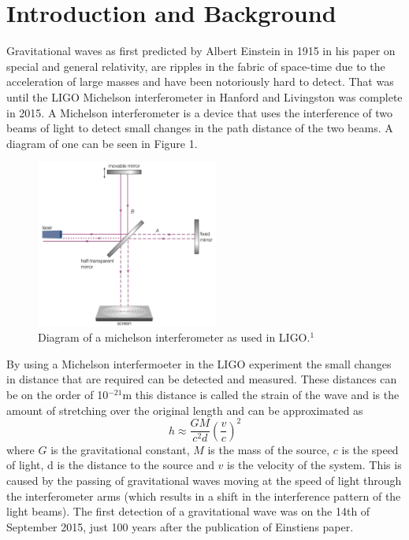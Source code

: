 \documentclass[]{article}
\begin{document}
\section*{Introduction and Background}
Gravitational waves as first predicted by Albert Einstein in 1915 in his paper on
special and general relativity, are ripples in the fabric of space-time due to the acceleration of large masses
and have been notoriously hard to detect. That was until
the LIGO Michelson interferometer in Hanford and Livingston was complete in 2015.
A Michelson interferometer is a device that uses the interference of two beams of
light to detect small changes in the path distance of the two beams. A diagram of one can
be seen in Figure 1.
\begin{figure}[h]
    \includegraphics[width=6cm]{images/michelson_interferometer.png}
    \caption{Diagram of a michelson interferometer as used in LIGO.$^1$}
    \label{fig:michelson}
\end{figure}
\newline
By using a Michelson interfermoeter in the LIGO experiment the small changes in
distance that are required can be detected and measured. These distances can be on the
order of 10$^{-21}$m this distance is called the strain of the wave and
is the amount of stretching over the original length and can be approximated as
\begin{equation}h \approx \frac{GM}{c^2d}\left(\frac{v}{c}\right)^2 \label{eq:strain}\end{equation}
where $G$ is the gravitational constant, $M$ is the mass of the source, $c$ is the speed of light,
d is the distance to the source and $v$ is the velocity of the system.
\newline
This is caused by the passing of gravitational waves moving at the speed of light
through the
interferometer arms (which results in a shift in the interference pattern of the light beams).
The first detection of a gravitational wave was on the 14th of
September 2015, just 100 years after the publication of Einstiens paper.
\end{document}
